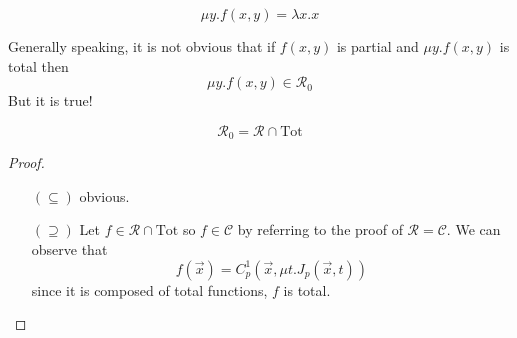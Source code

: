 \[
  \mu y . f(x,y) = \lambda x . x
\]

Generally speaking, it is not obvious that if $f(x,y)$ is partial and
$\mu y . f(x,y)$ is total then \[\mu y . f(x,y) \in \mathcal{R}_0\]
But it is true!

\begin{theorem}
  \[\mathcal{R}_0 = \mathcal{R}\cap \text{Tot}\]
  \begin{proof}
    \begin{enumerate}
    \item[$(\subseteq)$] obvious.
    \item[$(\supseteq)$] Let $f \in \mathcal{R} \cap \text{Tot}$ so
      $f \in \mathcal{C}$ by referring to the proof of $\mathcal{R = C}$.
      We can observe that
      \[f(\vec{x}) = C_p^1 ( \vec{x} , \mu t . J_p(\vec{x}, t))\]
      since it is composed of total functions, $f$ is total.
    \end{enumerate}
  \end{proof}
\end{theorem}
